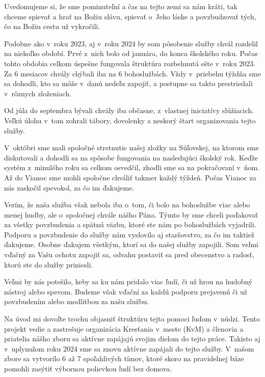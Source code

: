Uvedomujeme si, že sme pominuteľní a čas na tejto zemi sa nám kráti, tak chceme spievať a hrať na Božiu slávu, spievať o~Jeho láske a povzbudzovať tých, čo na Božiu cestu už vykročili.




Podobne ako v~roku 2023, aj v~roku 2024 by som pôsobenie služby chvál rozdelil na niekoľko období.
Prvé z~nich bolo od januára, do konca školského roku. Počas tohto obdobia celkom úspešne fungovala štruktúra rozbehnutá ešte v~roku 2023. Za 6 mesiacov chvály chýbali iba na 6 bohoslužbách. Vždy v~priebehu týždňa sme sa dohodli, kto sa môže v~danú nedeľu zapojiť, a postupne sa takto prestriedali v~rôznych zloženiach.

Od júla do septembra bývali chvály iba občasne, z~vlastnej iniciatívy slúžiacich. Veľkú úlohu v~tom zohrali tábory, dovolenky a neskorý štart organizovania tejto služby.

V~októbri sme mali spoločné stretnutie našej zložky na Súľovskej, na ktorom sme diskutovali a dohodli sa na spôsobe fungovania na nasledujúci školský rok. Keďže systém z~minulého roku sa celkom osvedčil, zhodli sme sa na pokračovaní v~ňom. Až do Vianoc sme mohli spoločne chváliť takmer každý týždeň. Počas Vianoc za nás zaskočil spevokol, za čo im ďakujeme.

Verím, že naša služba však nebola iba o~tom, či bolo na bohoslužbe viac alebo menej hudby, ale o~spoločnej chvále nášho Pána. Týmto by sme chceli poďakovať za všetky povzbudenia a spätnú väzbu, ktoré ste nám po bohoslužbách vyjadrili. Podporu a povzbudenie do služby nám vyslovilo aj staršovstvo, za čo im taktiež ďakujeme. Osobne ďakujem všetkým, ktorí sa do našej služby zapojili. Som veľmi vďačný za Vašu ochotu zapojiť sa, odvahu postaviť sa pred obecenstvo a radosť, ktorú ste do služby priniesli.

Veľmi by nás potešilo, keby sa ku nám pridalo viac ľudí, či už hrou na hudobný nástroj alebo spevom. Budeme však vďační za každú podporu prejavenú či už povzbudením alebo modlitbou za našu službu.




Na úvod mi dovoľte trochu objasniť štruktúru tejto pomoci ľuďom v~núdzi. Tento projekt vedie a zastrešuje organizácia Kresťania v~meste (KvM) a členovia a priatelia nášho zboru sa aktívne zapájajú svojim dielom do tejto práce. Takisto aj v~uplynulom roku 2024 sme sa znovu aktívne zapájali do tejto služby. V~našom zbore sa vytvorilo 6 až 7 spoľahlivých tímov, ktoré skoro na pravidelnej báze pomohli zasýtiť výbornou polievkou ľudí bez domova.

